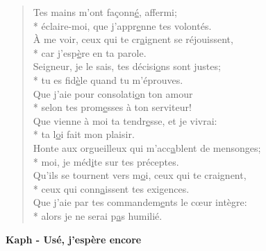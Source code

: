 \begin{verse}
Tes mains m’ont façonn\underline{é}, affermi; \\*
éclaire-moi, que j’appr\underline{e}nne tes volontés. \\
À me voir, ceux qui te cr\underline{a}ignent se réjouissent, \\*
car j’esp\underline{è}re en ta parole. \\
Seigneur, je le sais, tes décisi\underline{o}ns sont justes; \\*
tu es fid\underline{è}le quand tu m’éprouves. \\
Que j’aie pour consolati\underline{o}n ton amour \\*
selon tes prom\underline{e}sses à ton serviteur! \\
Que vienne à moi ta tendr\underline{e}sse, et je vivrai: \\*
ta l\underline{o}i fait mon plaisir. \\
Honte aux orgueilleux qui m’acc\underline{a}blent de mensonges; \\*
moi, je méd\underline{i}te sur tes préceptes. \\
Qu’ils se tournent vers m\underline{o}i, ceux qui te craignent, \\*
ceux qui conn\underline{a}issent tes exigences. \\
Que j’aie par tes commandem\underline{e}nts le cœur intègre: \\*
alors je ne serai p\underline{a}s humilié. \\
\end{verse}
\textbf{Kaph - Usé, j’espère encore}
